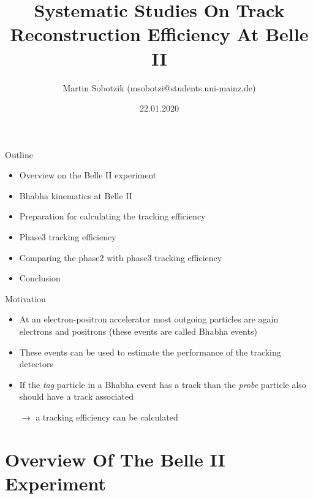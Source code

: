 \documentclass[8pt]{beamer}
\title{Systematic Studies On Track Reconstruction Efficiency At Belle II}
\date{22.01.2020}
\author{Martin Sobotzik (msobotzi@students.uni-mainz.de)}
\institute{Johannes Gutenberg-Universit\"at Mainz}
\begin{document}
\maketitle
%


\newcommand{\boundellipse}[3]%
{(#1) ellipse (#2 and #3)
}

\begin{frame}{Outline}




	\begin{itemize}
		\item Overview on the Belle II experiment
		\item Bhabha kinematics at Belle II
		\item Preparation for calculating the tracking efficiency
		\item Phase3 tracking efficiency
		\item Comparing the phase2 with phase3 tracking efficiency
		\item Conclusion
		
		
	\end{itemize}
\end{frame}



\begin{frame}{Motivation}
	\begin{itemize}
		\item At an electron-positron accelerator most outgoing particles are again electrons and positrons (these events are called Bhabha events)
		\item These events can be used to estimate the performance of the tracking detectors
		\item If the \textit{tag} particle in a Bhabha event has a track than the \textit{probe} particle also should have a track associated 
		
		$\rightarrow$ a tracking efficiency can be calculated
	\end{itemize}
\end{frame}


\section{Overview Of The Belle II Experiment}
\end{document}
